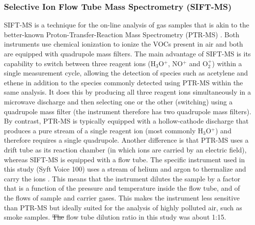 \documentclass[acp, manuscript]{copernicus}
\providecommand{\DIFadd}[1]{{\protect\color{blue}\uwave{#1}}} %
\providecommand{\DIFdel}[1]{{\protect\color{red}\sout{#1}}}                      %
\providecommand{\DIFaddbegin}{} %
\providecommand{\DIFaddend}{} %
\providecommand{\DIFdelbegin}{} %
\providecommand{\DIFdelend}{} %
\begin{document}
\subsubsection{Selective Ion Flow Tube Mass Spectrometry (SIFT-MS)}
SIFT-MS is a technique for the on-line analysis of gas samples that is akin to the better-known Proton-Transfer-Reaction Mass Spectrometry (PTR-MS) \citep{Blake2009}. Both instruments use chemical ionization to ionize the VOCs present in air and both are equipped with quadrupole mass filters. The main advantage of SIFT-MS is its capability to switch between three reagent ions (H$_3$O$^+$, NO$^+$ and O$_{2}^+$) within a single measurement cycle, allowing the detection of species such as acetylene and ethene in addition to the species commonly detected using PTR-MS within the same analysis. It does this by producing all three reagent ions simultaneously in a microwave discharge and then selecting one or the other (switching) using a quadrupole mass filter (the instrument therefore has two quadrupole mass filters). By contrast, PTR-MS is typically equipped with a hollow-cathode discharge that produces a pure stream of a single reagent ion (most commonly H$_3$O$^+$) and therefore requires a single quadrupole. 
Another difference is that PTR-MS uses a drift tube as its reaction chamber (in which ions are carried by an electric field), whereas SIFT-MS is equipped with a flow tube. The specific instrument used in this study (Syft Voice 100) uses a stream of helium and argon to thermalize and carry the ions \citep{Milligan2007}. 
This means that the instrument dilutes the sample by a factor that is a function of the pressure and temperature inside the flow tube, and of the flows of sample and carrier gases. This makes the instrument less sensitive than PTR-MS \citep{Blake2009} but ideally suited for the analysis of highly polluted air, such as smoke samples. \DIFdelbegin \DIFdel{The }\DIFdelend \DIFaddbegin \DIFadd{We calculated that the }\DIFaddend flow tube dilution ratio in this study was about 1:15.  
\end{document}
